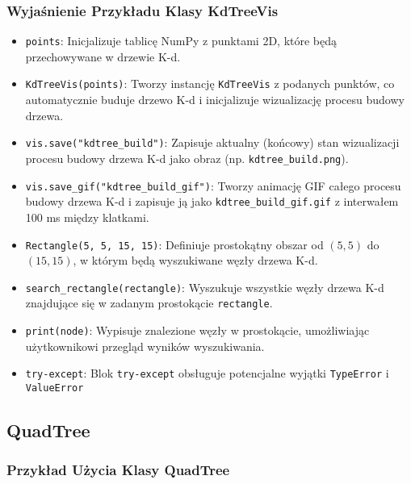 \documentclass[12pt]{article}
\begin{document}
\subsubsection{Wyjaśnienie Przykładu Klasy KdTreeVis}
\begin{itemize}
    \item \texttt{points}: Inicjalizuje tablicę NumPy z punktami 2D, które będą przechowywane w drzewie K-d.
    \item \texttt{KdTreeVis(points)}: Tworzy instancję \texttt{KdTreeVis} z podanych punktów, co automatycznie buduje drzewo K-d i inicjalizuje wizualizację procesu budowy drzewa.
    \item \texttt{vis.save("kdtree\_build")}: Zapisuje aktualny (końcowy) stan wizualizacji procesu budowy drzewa K-d jako obraz (np. \texttt{kdtree\_build.png}).
    \item \texttt{vis.save\_gif("kdtree\_build\_gif")}: Tworzy animację GIF całego procesu budowy drzewa K-d i zapisuje ją jako \texttt{kdtree\_build\_gif.gif} z interwałem 100 ms między klatkami.
    \item \texttt{Rectangle(5, 5, 15, 15)}: Definiuje prostokątny obszar od \((5,5)\) do \((15,15)\), w którym będą wyszukiwane węzły drzewa K-d.
    \item \texttt{search\_rectangle(rectangle)}: Wyszukuje wszystkie węzły drzewa K-d znajdujące się w zadanym prostokącie \texttt{rectangle}.
    \item \texttt{print(node)}: Wypisuje znalezione węzły w prostokącie, umożliwiając użytkownikowi przegląd wyników wyszukiwania.
    \item \texttt{try-except}: Blok \texttt{try-except} obsługuje potencjalne wyjątki \texttt{TypeError} i \texttt{ValueError}
\end{itemize}


\subsection{QuadTree}
\subsubsection{Przykład Użycia Klasy QuadTree}
\end{document}
